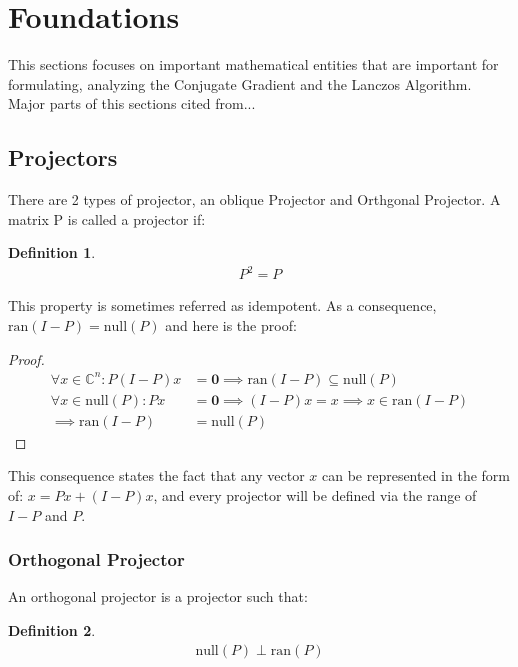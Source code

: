 \documentclass[]{article}
\theoremstyle{definition}
\newtheorem{definition}{Definition}
\begin{document}
\section{Foundations}
    This sections focuses on important mathematical entities that are important for formulating, analyzing the Conjugate Gradient and the Lanczos Algorithm. Major parts of this sections cited from... 

    \subsection{Projectors}
        There are 2 types of projector, an oblique Projector and Orthgonal Projector. A matrix P is called a projector if: 
        \begin{definition}
            \begin{align}
                P^2 = P
            \end{align}    
        \end{definition}
        
        This property is sometimes referred as idempotent. As a consequence, $\text{ran}(I - P) = \text{null}(P)$ and here is the proof: 
        \begin{proof}
            \begin{align}
                \forall x \in \mathbb{C}^n: P(I - P)x &= \mathbf{0} \implies \text{ran}(I - P)\subseteq \text{null}(P)
                \\
                \forall x \in \text{null}(P): Px &= \mathbf{0} \implies (I - P)x = x \implies x \in \text{ran}(I - P)
                \\
                \implies \text{ran}(I - P) &= \text{null}(P)
                \label{a:1.1.4}
            \end{align}
        \end{proof}
        \noindent
        This consequence states the fact that any vector $x$ can be represented in the form of: $x = Px + (I - P)x$, and every projector will be defined via the range of $I - P$ and $P$. 
        
        \subsubsection{Orthogonal Projector}
            An orthogonal projector is a projector such that: 
            \begin{definition}
                \begin{align}
                    \text{null}(P) \perp \text{ran}(P)
                \end{align}    
            \end{definition}
            
\end{document}
